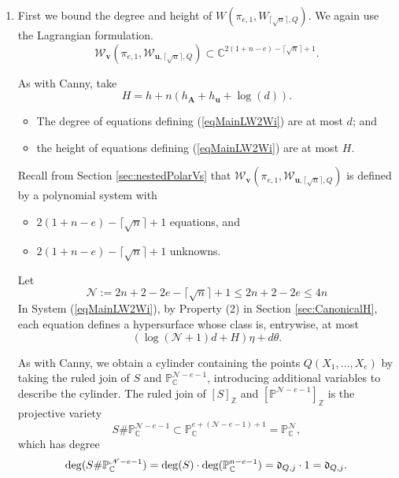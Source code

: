 \documentclass[12pt]{article}
\newcommand{\ZZ}{{\mathbb{Z}}}
\def\C{\mathbb{C}}
\def\P{\mathbb{P}}
\def\fd{\frak{d}}
\def\C{\mathbb{C}}
\def\P{\mathbb{P}}
\begin{document}
\begin{itemize}
\begin{enumerate}
\begin{enumerate}
    \item 

First we bound the degree and height of  $W(\pi_{e,1},W_{\lceil \sqrt{n} \rceil ,Q})$. We again use the Lagrangian formulation. 
\begin{equation}\label{eqMainLW2Wi}
\mathscr{W}_{\bm v}(\pi_{e,1},\mathscr{W}_{\bm u,\lceil \sqrt{n} \rceil ,Q}) \subset \C^{2(1+n-e)-\lceil \sqrt{n} \rceil +1}.
\end{equation}


As with Canny, take 
\[
H = h + n(h_{\bm A} + h_{\bm u} + \log(d)). 
\]
%
\begin{itemize} 
    \item
    The degree of equations defining (\ref{eqMainLW2Wi}) are at most  $d$; and
    \item the height of equations defining (\ref{eqMainLW2Wi}) are at most $H$. 
\end{itemize}
%


%
Recall from Section \ref{sec:nestedPolarVs} that $\mathscr{W}_{\bm v}(\pi_{e,1},\mathscr{W}_{\bm u,\lceil \sqrt{n} \rceil ,Q})$ is defined by a polynomial system with
    \begin{itemize}
        \item $2(1+n-e)-\lceil \sqrt{n} \rceil +1$ equations, and
        \item $2(1+n-e)-\lceil \sqrt{n} \rceil +1$ unknowns. 
    \end{itemize}



    
\noindent 
Let 
\[
\mathscr{N} := 2n+2-2e-\lceil \sqrt{n} \rceil+1 \leq 2n+2-2e \leq 4n
\]
In System (\ref{eqMainLW2Wi}), by Property (2) in Section \ref{sec:CanonicalH}, each equation defines a hypersurface whose class is, entrywise, at most  
\[
(\log(\mathscr{N}+1)d + H)\eta + d\theta.
\]






As with Canny, we obtain a cylinder containing the points $Q(X_1,\hdots,X_e)$ by taking the ruled join of $S$ and $\P_{\C}^{\mathscr{N}-e-1}$, introducing additional variables to describe the cylinder. The ruled join of $[S]_{\ZZ}$ and $[\P^{\mathscr{N}-e-1}]_{\ZZ}$ is the projective variety 
\[
S \# \P_{\C}^{\mathscr{N}-e-1} \subset \P_{\C}^{e + (\mathscr{N}-e-1) +1}
=
\P_{\C}^\mathscr{N},
\] 
which has degree 
\[
\deg (S \# \P_{\C}^{\mathscr{N}-e-1}) = \deg( S) \cdot \deg (\P_{\C}^{n-e-1})= \fd_{Q,j} \cdot 1 = \fd_{Q,j}.
\] 


\end{enumerate}
\end{enumerate}
\end{itemize}
\end{document}
